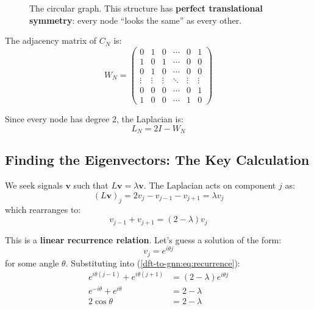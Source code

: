 \begin{notechapter}
\begin{figure}[H]
\caption{The circular graph. This structure has \textbf{perfect 
         translational symmetry}: every node ``looks the same'' as 
         every other.}
\label{dft-to-gnn:fig:circular-graph}
\end{figure}

The adjacency matrix of $C_N$ is:
\begin{equation}
W_N = \begin{pmatrix}
0 & 1 & 0 & \cdots & 0 & 1 \\
1 & 0 & 1 & \cdots & 0 & 0 \\
0 & 1 & 0 & \cdots & 0 & 0 \\
\vdots & \vdots & \vdots & \ddots & \vdots & \vdots \\
0 & 0 & 0 & \cdots & 0 & 1 \\
1 & 0 & 0 & \cdots & 1 & 0
\end{pmatrix}
\end{equation}

Since every node has degree 2, the Laplacian is:
\begin{equation}
L_N = 2I - W_N
\end{equation}

\subsection{Finding the Eigenvectors: The Key Calculation}

We seek signals $\mathbf{v}$ such that $L\mathbf{v} = \lambda\mathbf{v}$. 
The Laplacian acts on component $j$ as:
\begin{equation}
(L\mathbf{v})_j = 2v_j - v_{j-1} - v_{j+1} = \lambda v_j
\end{equation}
which rearranges to:
\begin{equation}
v_{j-1} + v_{j+1} = (2 - \lambda) v_j
\label{dft-to-gnn:eq:recurrence}
\end{equation}

This is a \textbf{linear recurrence relation}. Let's guess a solution 
of the form:
\begin{equation}
v_j = e^{i\theta j}
\end{equation}
for some angle $\theta$. Substituting into (\ref{dft-to-gnn:eq:recurrence}):
\begin{align}
e^{i\theta(j-1)} + e^{i\theta(j+1)} &= (2 - \lambda) e^{i\theta j} \\
e^{-i\theta} + e^{i\theta} &= 2 - \lambda \\
2\cos\theta &= 2 - \lambda
\end{align}


\end{notechapter}
